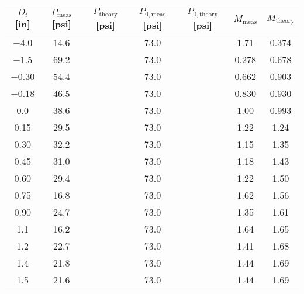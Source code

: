 \begin{tabular}{ccccccc}
\toprule
$D_t$ [\unit{in}] & $P_\text{meas}$ [\unit{psi}] & $P_\text{theory}$ [\unit{psi}] & $P_{0,\text{meas}}$ [\unit{psi}] & $P_{0,\text{theory}}$ [\unit{psi}] & $M_\text{meas}$ & $M_\text{theory}$ \\
\midrule
\num{-4.0} & \num{14.6} &  & \num{73.0} &  & \num{1.71} & \num{0.374} \\ 
\num{-1.5} & \num{69.2} &  & \num{73.0} &  & \num{0.278} & \num{0.678} \\ 
\num{-0.30} & \num{54.4} &  & \num{73.0} &  & \num{0.662} & \num{0.903} \\ 
\num{-0.18} & \num{46.5} &  & \num{73.0} &  & \num{0.830} & \num{0.930} \\ 
\num{0.0} & \num{38.6} &  & \num{73.0} &  & \num{1.00} & \num{0.993} \\ 
\num{0.15} & \num{29.5} &  & \num{73.0} &  & \num{1.22} & \num{1.24} \\ 
\num{0.30} & \num{32.2} &  & \num{73.0} &  & \num{1.15} & \num{1.35} \\ 
\num{0.45} & \num{31.0} &  & \num{73.0} &  & \num{1.18} & \num{1.43} \\ 
\num{0.60} & \num{29.4} &  & \num{73.0} &  & \num{1.22} & \num{1.50} \\ 
\num{0.75} & \num{16.8} &  & \num{73.0} &  & \num{1.62} & \num{1.56} \\ 
\num{0.90} & \num{24.7} &  & \num{73.0} &  & \num{1.35} & \num{1.61} \\ 
\num{1.1} & \num{16.2} &  & \num{73.0} &  & \num{1.64} & \num{1.65} \\ 
\num{1.2} & \num{22.7} &  & \num{73.0} &  & \num{1.41} & \num{1.68} \\ 
\num{1.4} & \num{21.8} &  & \num{73.0} &  & \num{1.44} & \num{1.69} \\ 
\num{1.5} & \num{21.6} &  & \num{73.0} &  & \num{1.44} & \num{1.69} \\ 
\bottomrule
\end{tabular}
